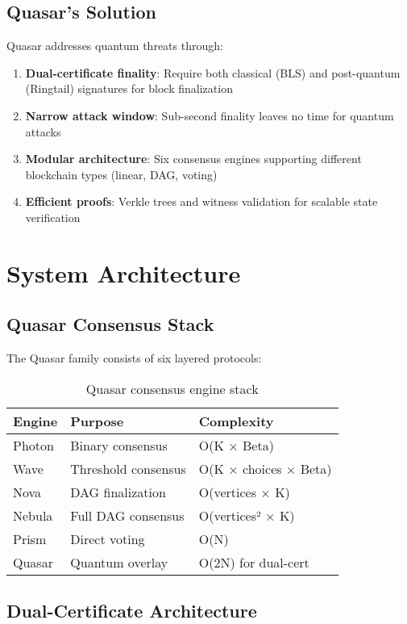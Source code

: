\documentclass[11pt]{article}
\begin{document}
\subsection{Quasar's Solution}

Quasar addresses quantum threats through:
\begin{enumerate}
\item \textbf{Dual-certificate finality}: Require both classical (BLS) and post-quantum (Ringtail) signatures for block finalization
\item \textbf{Narrow attack window}: Sub-second finality leaves no time for quantum attacks
\item \textbf{Modular architecture}: Six consensus engines supporting different blockchain types (linear, DAG, voting)
\item \textbf{Efficient proofs}: Verkle trees and witness validation for scalable state verification
\end{enumerate}

\section{System Architecture}

\subsection{Quasar Consensus Stack}

The Quasar family consists of six layered protocols:

\begin{table}[h]
\centering
\begin{tabular}{@{}lll@{}}
\toprule
\textbf{Engine} & \textbf{Purpose} & \textbf{Complexity} \\
\midrule
Photon & Binary consensus & O(K × Beta) \\
Wave & Threshold consensus & O(K × choices × Beta) \\
Nova & DAG finalization & O(vertices × K) \\
Nebula & Full DAG consensus & O(vertices² × K) \\
Prism & Direct voting & O(N) \\
Quasar & Quantum overlay & O(2N) for dual-cert \\
\bottomrule
\end{tabular}
\caption{Quasar consensus engine stack}
\label{tab:engines}
\end{table}

\subsection{Dual-Certificate Architecture}
\end{document}
